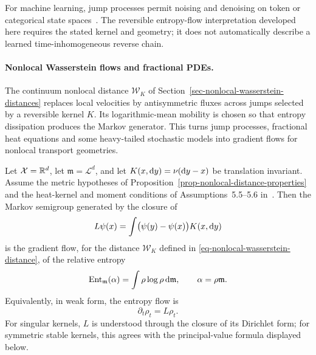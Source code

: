 For machine learning, jump processes permit noising and denoising on token or categorical state spaces~\cite{Austin2021DiscreteDiffusion,Campbell2022DiscreteDenoising}. The reversible entropy-flow interpretation developed here requires the stated kernel and geometry; it does not automatically describe a learned time-inhomogeneous reverse chain.

\paragraph{Nonlocal Wasserstein flows and fractional PDEs.}

The continuum nonlocal distance \(\mathcal W_K\) of Section~\ref{sec-nonlocal-wasserstein-distances} replaces local velocities by antisymmetric fluxes across jumps selected by a reversible kernel \(K\). Its logarithmic-mean mobility is chosen so that entropy dissipation produces the Markov generator. This turns jump processes, fractional heat equations and some heavy-tailed stochastic models into gradient flows for nonlocal transport geometries.

\begin{prop}\label{prop-nonlocal-entropy-gradient-flow}
	Let $\mathcal X=\mathbb{R}^d$, let $\mathfrak m=\mathcal L^d$, and let $K(x,\mathrm{d} y)=\nu(\mathrm{d} y-x)$ be translation invariant. Assume the metric hypotheses of Proposition~\ref{prop-nonlocal-distance-properties} and the heat-kernel and moment conditions of Assumptions~5.5--5.6 in~\cite{Erbar2012JumpEntropy}. Then the Markov semigroup generated by the closure of
	\[
		L\psi(x)
		=
		\int\bigl(\psi(y)-\psi(x)\bigr)K(x,\mathrm{d} y)
	\]
	is the gradient flow, for the distance \(\mathcal W_K\) defined in \eqref{eq-nonlocal-wasserstein-distance}, of the relative entropy
	\[
		\mathrm{Ent}_{\mathfrak m}(\alpha)
		=
		\int \rho\log\rho\,\mathrm{d}\mathfrak m,
		\qquad
		\alpha=\rho\mathfrak m.
	\]
	Equivalently, in weak form, the entropy flow is
	\begin{equation}\label{eq-nonlocal-entropy-flow}
		\partial_t\rho_t=L\rho_t.
	\end{equation}
	For singular kernels, \(L\) is understood through the closure of its Dirichlet form; for symmetric stable kernels, this agrees with the principal-value formula displayed below.
\end{prop}

